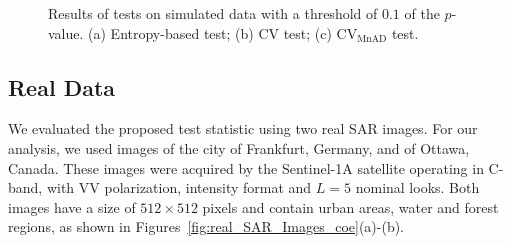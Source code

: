 \documentclass[remotesensing,article,submit,moreauthors,pdftex]{Definitions/mdpi}
\begin{document}
\begin{figure}[H]

{\centering {}

}

\caption{Results of tests on simulated data with a threshold of $0.1$ of the $p$-value. (a) Entropy-based test; (b) CV test; (c) $\text{CV}_{\text{MnAD}}$ test.}\label{fig:sim_SAR_Images_p05}
\end{figure}

\hypertarget{real-data}{%
\subsection{Real Data}\label{real-data}}

We evaluated the proposed test statistic using two real SAR images. 
For our analysis, we used images of the city of Frankfurt, Germany, and of
Ottawa, Canada. 
These images were acquired by the Sentinel-1A satellite operating in C-band, with VV polarization, intensity format and
\(L=5\) nominal looks.
Both images have a size of \(512 \times 512\) pixels and contain urban areas, water and forest regions, as shown in
Figures~\ref{fig:real_SAR_Images_coe}(a)-(b).
\end{document}
